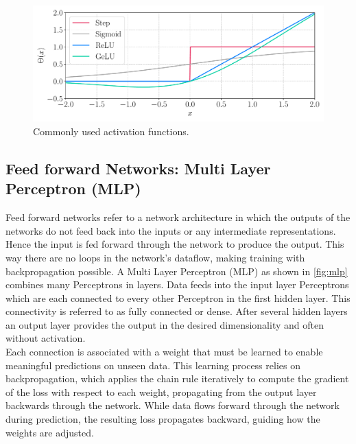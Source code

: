 \begin{figure}[H]
    \centering
    \includegraphics[width=\textwidth]{../fig/background/activation_functions.pdf}
    \caption{Commonly used activation functions.}
    \label{fig:activation_functions}
\end{figure}
\subsection{Feed forward Networks: Multi Layer Perceptron (MLP)}
\label{subsec:background_mlp}
Feed forward networks refer to a network architecture in which the outputs of the networks do not feed back into the inputs or any intermediate representations. Hence the input is fed forward through the network to produce the output. This way there are no loops in the network's dataflow, making training with backpropagation possible. A Multi Layer Perceptron (MLP) as shown in \autoref{fig:mlp} combines many Perceptrons in layers. Data feeds into the input layer Perceptrons which are each connected to every other Perceptron in the first hidden layer. This connectivity is referred to as fully connected or dense. After several hidden layers an output layer provides the output in the desired dimensionality and often without activation.\\
Each connection is associated with a weight that must be learned to enable meaningful predictions on unseen data. This learning process relies on backpropagation, which applies the chain rule iteratively to compute the gradient of the loss with respect to each weight, propagating from the output layer backwards through the network. While data flows forward through the network during prediction, the resulting loss propagates backward, guiding how the weights are adjusted. \\
